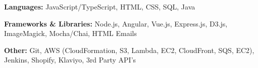 
\begin{cvparagraph}

\textbf{Languages:} JavaScript/TypeScript, HTML, CSS, SQL, Java

\textbf{Frameworks \& Libraries:} Node.js, Angular, Vue.js, Express.js, D3.js, ImageMagick, Mocha/Chai, HTML Emails

\textbf{Other:} Git, AWS (CloudFormation, S3, Lambda, EC2, CloudFront, SQS, EC2), Jenkins, Shopify, Klaviyo, 3rd Party API's

\end{cvparagraph}